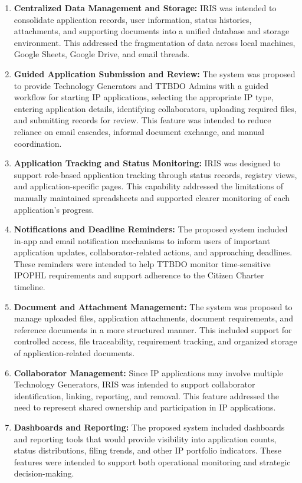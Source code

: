 \begin{enumerate}
   \item \textbf{Centralized Data Management and Storage:} IRIS was intended to consolidate application records, user information, status histories, attachments, and supporting documents into a unified database and storage environment. This addressed the fragmentation of data across local machines, Google Sheets, Google Drive, and email threads.
   \item \textbf{Guided Application Submission and Review:} The system was proposed to provide Technology Generators and TTBDO Admins with a guided workflow for starting IP applications, selecting the appropriate IP type, entering application details, identifying collaborators, uploading required files, and submitting records for review. This feature was intended to reduce reliance on email cascades, informal document exchange, and manual coordination.
   \item \textbf{Application Tracking and Status Monitoring:} IRIS was designed to support role-based application tracking through status records, registry views, and application-specific pages. This capability addressed the limitations of manually maintained spreadsheets and supported clearer monitoring of each application’s progress.
   \item \textbf{Notifications and Deadline Reminders:} The proposed system included in-app and email notification mechanisms to inform users of important application updates, collaborator-related actions, and approaching deadlines. These reminders were intended to help TTBDO monitor time-sensitive IPOPHL requirements and support adherence to the Citizen Charter timeline.
   \item \textbf{Document and Attachment Management:} The system was proposed to manage uploaded files, application attachments, document requirements, and reference documents in a more structured manner. This included support for controlled access, file traceability, requirement tracking, and organized storage of application-related documents.
   \item \textbf{Collaborator Management:} Since IP applications may involve multiple Technology Generators, IRIS was intended to support collaborator identification, linking, reporting, and removal. This feature addressed the need to represent shared ownership and participation in IP applications.
   \item \textbf{Dashboards and Reporting:} The proposed system included dashboards and reporting tools that would provide visibility into application counts, status distributions, filing trends, and other IP portfolio indicators. These features were intended to support both operational monitoring and strategic decision-making.

\end{enumerate}
